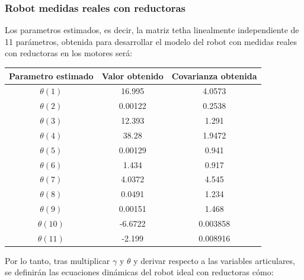 \subsubsection{Robot medidas reales con reductoras}
Los parametros estimados, es decir, la matriz tetha linealmente independiente de 11 parámetros, obtenida para desarrollar el modelo del robot con medidas reales con reductoras en los motores será:
\begin{center}
	\begin{tabular}{| c | c | c |}

		\hline
		Parametro estimado & Valor obtenido & Covarianza obtenida \\
		\hline
		$\theta(1) $ & 16.995 & 4.0573 \\
		\hline
		$\theta(2) $ & 0.00122 & 0.2538 \\
		\hline
		$\theta(3) $ & 12.393 & 1.291 \\
		\hline
		$\theta(4) $ & 38.28 & 1.9472 \\
		\hline
		$\theta(5) $ & 0.00129 & 0.941 \\
		\hline
		$\theta(6) $ & 1.434 & 0.917 \\
		\hline
		$\theta(7) $ & 4.0372 & 4.545 \\
		\hline
		$\theta(8) $ & 0.0491 & 1.234 \\
		\hline
		$\theta(9) $ & 0.00151 & 1.468 \\
		\hline
		$\theta(10) $ & -6.6722 & 0.003858 \\
		\hline
		$\theta(11) $ & -2.199 & 0.008916 \\
		\hline
	\end{tabular}
\end{center}
Por lo tanto, tras multiplicar $\gamma$ y $\theta$ y derivar respecto a las variables articulares, se definirán las ecuaciones dinámicas del robot ideal con reductoras cómo:\\

